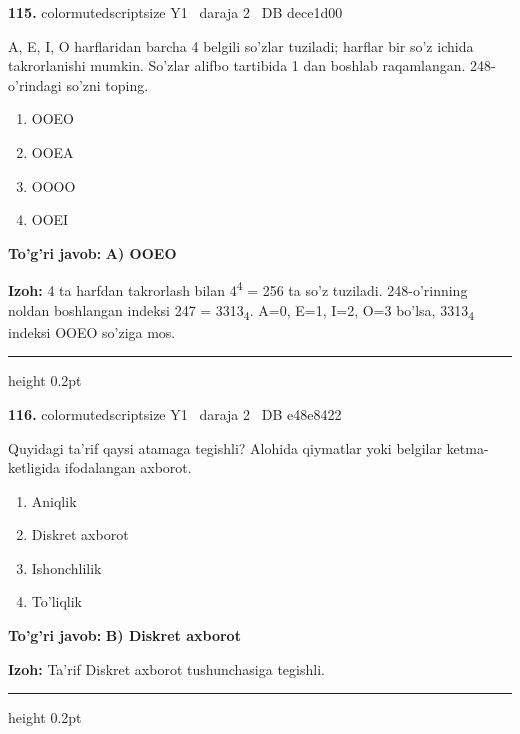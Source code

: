 \documentclass[10pt,a4paper,oneside]{article}
\begin{document}
\noindent\textbf{\color{ink}115.}  {color{muted}scriptsize Y1 \textbullet\ daraja 2 \textbullet\ DB dece1d00}
\par
A, E, I, O harflaridan barcha 4 belgili so'zlar tuziladi; harflar bir so'z ichida takrorlanishi mumkin. So'zlar alifbo tartibida 1 dan boshlab raqamlangan. 248-o'rindagi so'zni toping.
\begin{enumerate}[label=\Alph*),leftmargin=9mm]
\item OOEO
\item OOEA
\item OOOO
\item OOEI
\end{enumerate}
\begin{tcolorbox}[enhanced,breakable,colback=teal!4,colframe=teal!50!black,boxrule=0.5pt,arc=1.1mm,left=3mm,right=3mm,top=1.7mm,bottom=1.7mm,before skip=2mm,after skip=2mm]
\textbf{\color{teal}To'g'ri javob:} \textbf{A) OOEO}
\par\smallskip
\textbf{Izoh:} 4 ta harfdan takrorlash bilan 4\textsuperscript{4} = 256 ta so'z tuziladi. 248-o'rinning noldan boshlangan indeksi 247 = 3313\textsubscript{4}. A=0, E=1, I=2, O=3 bo'lsa, 3313\textsubscript{4} indeksi OOEO so'ziga mos.
\end{tcolorbox}
\vspace{2mm}\hrule height 0.2pt \vspace{3mm}

\noindent\textbf{\color{ink}116.}  {color{muted}scriptsize Y1 \textbullet\ daraja 2 \textbullet\ DB e48e8422}
\par
Quyidagi ta'rif qaysi atamaga tegishli? Alohida qiymatlar yoki belgilar ketma-ketligida ifodalangan axborot.
\begin{enumerate}[label=\Alph*),leftmargin=9mm]
\item Aniqlik
\item Diskret axborot
\item Ishonchlilik
\item To'liqlik
\end{enumerate}
\begin{tcolorbox}[enhanced,breakable,colback=teal!4,colframe=teal!50!black,boxrule=0.5pt,arc=1.1mm,left=3mm,right=3mm,top=1.7mm,bottom=1.7mm,before skip=2mm,after skip=2mm]
\textbf{\color{teal}To'g'ri javob:} \textbf{B) Diskret axborot}
\par\smallskip
\textbf{Izoh:} Ta'rif Diskret axborot tushunchasiga tegishli.
\end{tcolorbox}
\vspace{2mm}\hrule height 0.2pt \vspace{3mm}
\end{document}
